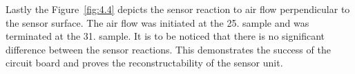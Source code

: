 Lastly the Figure~\ref{fig:4.4} depicts the sensor reaction to air flow perpendicular to the sensor surface. The air flow was initiated at the 25. sample and was terminated at the 31. sample. It is to be noticed that there is no significant difference between the sensor reactions. This demonstrates the success of the circuit board and proves the reconstructability of the sensor unit.  









